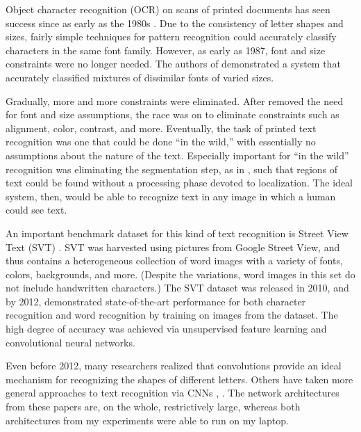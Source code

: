 \documentclass[final]{ukthesis}
\begin{document}
Object character recognition (OCR) on scans of printed documents has seen success since as early as the 1980s \cite{mantas1986overview,govindan1990character}. Due to the consistency of letter shapes and sizes, fairly simple techniques for pattern recognition could accurately classify characters in the same font family. However, as early as 1987, font and size constraints were no longer needed. The authors of \cite{kahan1987recognition} demonstrated a system that accurately classified mixtures of dissimilar fonts of varied sizes.

Gradually, more and more constraints were eliminated. After \cite{kahan1987recognition} removed the need for font and size assumptions, the race was on to eliminate constraints such as alignment, color, contrast, and more. Eventually, the task of printed text recognition was one that could be done ``in the wild,'' \cite{smith2007overview,wang2012end,jaderberg2016reading} with essentially no assumptions about the nature of the text. Especially important for ``in the wild'' recognition was eliminating the segmentation step, as in \cite{rusinol2015efficient}, such that regions of text could be found without a processing phase devoted to localization. The ideal system, then, would be able to recognize text in any image in which a human could see text.

An important benchmark dataset for this kind of text recognition is Street View Text (SVT) \cite{wang2010word}. SVT was harvested using pictures from Google Street View, and thus contains a heterogeneous collection of word images with a variety of fonts, colors, backgrounds, and more. (Despite the variations, word images in this set do not include handwritten characters.) The SVT dataset was released in 2010, and by 2012, \cite{wang2012end} demonstrated state-of-the-art performance for both character recognition and word recognition by training on images from the dataset. The high degree of accuracy was achieved via unsupervised feature learning and convolutional neural networks.

Even before 2012, many researchers realized that convolutions provide an ideal mechanism for recognizing the shapes of different letters. Others have taken more general approaches to text recognition via CNNs \cite{wang2012end,jaderberg2016reading}, . The network architectures from these papers are, on the whole, restrictively large, whereas both architectures from my experiments were able to run on my laptop.


\end{document}
